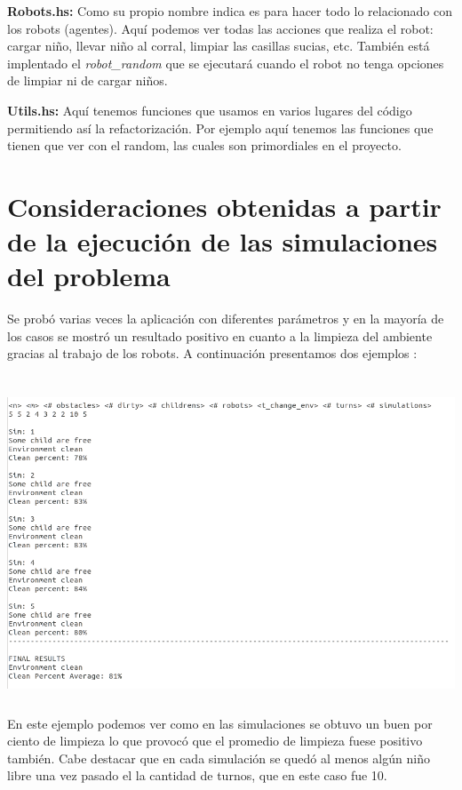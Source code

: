 \documentclass[a4paper,10pt]{article}
\begin{document}
\textbf{Robots.hs: } Como su propio nombre indica es para hacer todo lo relacionado con los robots (agentes). Aqu\'i podemos ver todas las acciones que realiza el robot: cargar ni\~no, llevar ni\~no al corral, limpiar las casillas sucias, etc. Tambi\'en est\'a implentado el \textit{robot\_random} que se ejecutar\'a cuando el robot no tenga opciones de limpiar ni de cargar ni\~nos. 

\textbf{Utils.hs: } Aqu\'i tenemos funciones que usamos en varios lugares del c\'odigo permitiendo as\'i la refactorizaci\'on. Por ejemplo aqu\'i tenemos las funciones que tienen que ver con el random, las cuales son primordiales en el proyecto.    

 \section*{Consideraciones obtenidas a partir de la ejecución de las simulaciones del problema}
Se prob\'o varias veces la aplicaci\'on con diferentes par\'ametros y en la mayor\'ia de los casos se mostr\'o un resultado positivo en cuanto a la limpieza del ambiente gracias al trabajo de los robots. A continuaci\'on presentamos dos ejemplos :


\includegraphics[width=15cm, height=10cm]{img/clean.png}\\
		
 En este ejemplo podemos ver como en las simulaciones se obtuvo un buen por ciento de limpieza lo que provoc\'o que el promedio de limpieza fuese positivo tambi\'en. Cabe destacar que en cada simulaci\'on se qued\'o al menos alg\'un ni\~no libre una vez pasado el la cantidad de turnos, que en este caso fue 10.
 
\end{document}
